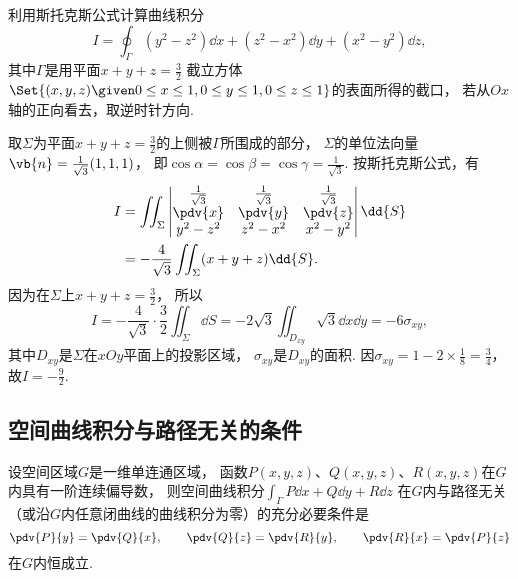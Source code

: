 \begin{example}
利用斯托克斯公式计算曲线积分\begin{equation*}
	I = \oint_\Gamma (y^2-z^2)\dd{x}+(z^2-x^2)\dd{y}+(x^2-y^2)\dd{z},
\end{equation*}
其中\(\Gamma\)是用平面\(x+y+z=\frac32\)
截立方体\(\Set{(x,y,z)\given0\leq x\leq1,0\leq y\leq1,0\leq z\leq1}\)的表面所得的截口，
若从\(Ox\)轴的正向看去，取逆时针方向.
\begin{solution}
取\(\Sigma\)为平面\(x+y+z=\frac32\)的上侧被\(\Gamma\)所围成的部分，
\(\Sigma\)的单位法向量\(\vb{n}=\frac1{\sqrt3}(1,1,1)\)，
即\(\cos\alpha=\cos\beta=\cos\gamma=\frac1{\sqrt3}\).
按斯托克斯公式，有\begin{align*}
	I &= \iint_\Sigma \begin{vmatrix}
		\frac1{\sqrt3} & \frac1{\sqrt3} & \frac1{\sqrt3} \\
		\pdv{x} & \pdv{y} & \pdv{z} \\
		y^2-z^2 & z^2-x^2 & x^2-y^2
	\end{vmatrix} \dd{S} \\
	&= -\frac4{\sqrt3} \iint_\Sigma (x+y+z) \dd{S}.
\end{align*}
因为在\(\Sigma\)上\(x+y+z=\frac32\)，
所以\begin{equation*}
	I = -\frac4{\sqrt3} \cdot \frac32 \iint_\Sigma \dd{S}
	= -2\sqrt3 \iint_{D_{xy}} \sqrt3 \dd{x}\dd{y}
	= -6 \sigma_{xy},
\end{equation*}
其中\(D_{xy}\)是\(\Sigma\)在\(xOy\)平面上的投影区域，
\(\sigma_{xy}\)是\(D_{xy}\)的面积.
因\(\sigma_{xy} = 1-2\times\frac18=\frac34\)，
故\(I=-\frac92\).
\end{solution}
\end{example}

\subsection{空间曲线积分与路径无关的条件}
\begin{theorem}\label{theorem:线积分与面积分.空间曲线积分与路径无关的条件}
设空间区域\(G\)是一维单连通区域，
函数\(P(x,y,z)\)、\(Q(x,y,z)\)、\(R(x,y,z)\)在\(G\)内具有一阶连续偏导数，
则空间曲线积分\(\int_\Gamma P\dd{x}+Q\dd{y}+R\dd{z}\)
在\(G\)内与路径无关（或沿\(G\)内任意闭曲线的曲线积分为零）的充分必要条件是\begin{equation*}
	\pdv{P}{y}=\pdv{Q}{x}, \qquad
	\pdv{Q}{z}=\pdv{R}{y}, \qquad
	\pdv{R}{x}=\pdv{P}{z}
\end{equation*}在\(G\)内恒成立.
\end{theorem}

